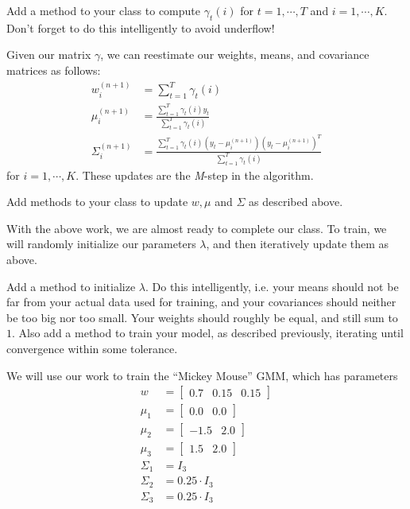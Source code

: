 \begin{problem}
Add a method to your class to compute $\gamma_{t}(i)$ for $t = 1, \cdots, T$ and $i = 1, \cdots, K$. Don't forget to do this intelligently to avoid underflow!
\end{problem}

Given our matrix $\gamma$, we can reestimate our weights, means, and covariance matrices as follows:
\begin{align*}
w_{i}^{(n+1)} & = \sum_{t=1}^{T} \gamma_{t}(i) \\
\mu_{i}^{(n+1)} & = \frac{\sum_{t=1}^{T} \gamma_{t}(i) y_{t}}{\sum_{t=1}^{T} \gamma_{t}(i)} \\
\Sigma_{i}^{(n+1)} & = \frac{\sum_{t=1}^{T} \gamma_{t}(i) (y_{t} - \mu_{i}^{(n+1)}) (y_{t} - \mu_{i}^{(n+1)})^{T}}{\sum_{t=1}^{T} \gamma_{t}(i)}
\end{align*}
for $i = 1, \cdots, K$. These updates are the \emph{M}-step in the algorithm.

\begin{problem}
Add methods to your class to update $w, \mu$ and $\Sigma$ as described above.
\end{problem}

With the above work, we are almost ready to complete our class. To train, we will randomly initialize our parameters $\lambda$, and then iteratively update them as above.

\begin{problem}
Add a method to initialize $\lambda$. Do this intelligently, i.e. your means should not be far from your actual data used for training, and your covariances should neither be too big nor too small. Your weights should roughly be equal, and still sum to $1$. Also add a method to train your model, as described previously, iterating until convergence within some tolerance.
\end{problem}

We will use our work to train the ``Mickey Mouse'' GMM, which has parameters
\begin{align*}
w & = \left[ \begin{array}{ccc} 0.7 & 0.15 & 0.15 \end{array} \right] \\
\mu_{1} & = \left[ \begin{array}{cc} 0.0 & 0.0 \end{array} \right] \\
\mu_{2} & = \left[ \begin{array}{cc} -1.5 & 2.0 \end{array} \right] \\
\mu_{3} & = \left[ \begin{array}{cc} 1.5 & 2.0 \end{array} \right] \\
\Sigma_{1} & = I_{3} \\
\Sigma_{2} & = 0.25 \cdot I_{3} \\
\Sigma_{3} & = 0.25 \cdot I_{3}
\end{align*}


